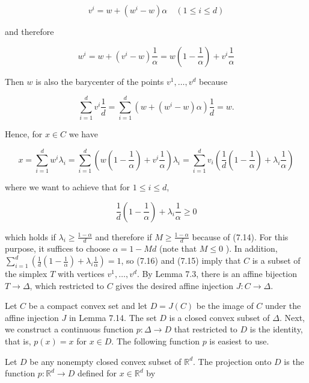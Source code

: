 \documentclass[12pt]{article}
\begin{document}
$$
v^{i}=w+\left(w^{i}-w\right) \alpha \quad(1 \leq i \leq d)
$$

and therefore

$$
w^{i}=w+\left(v^{i}-w\right) \frac{1}{\alpha}=w\left(1-\frac{1}{\alpha}\right)+v^{i} \frac{1}{\alpha}
$$

Then $w$ is also the barycenter of the points $v^{1}, \ldots, v^{d}$ because

$$
\sum_{i=1}^{d} v^{i} \frac{1}{d}=\sum_{i=1}^{d}\left(w+\left(w^{i}-w\right) \alpha\right) \frac{1}{d}=w .
$$

Hence, for $x \in C$ we have


\begin{equation*}
x=\sum_{i=1}^{d} w^{i} \lambda_{i}=\sum_{i=1}^{d}\left(w\left(1-\frac{1}{\alpha}\right)+v^{i} \frac{1}{\alpha}\right) \lambda_{i}=\sum_{i=1}^{d} v_{i}\left(\frac{1}{d}\left(1-\frac{1}{\alpha}\right)+\lambda_{i} \frac{1}{\alpha}\right) \tag{7.15}
\end{equation*}


where we want to achieve that for $1 \leq i \leq d$,


\begin{equation*}
\frac{1}{d}\left(1-\frac{1}{\alpha}\right)+\lambda_{i} \frac{1}{\alpha} \geq 0 \tag{7.16}
\end{equation*}


which holds if $\lambda_{i} \geq \frac{1-\alpha}{d}$ and therefore if $M \geq \frac{1-\alpha}{d}$ because of (7.14). For this purpose, it suffices to choose $\alpha=1-M d$ (note that $M \leq 0$ ). In addition, $\sum_{i=1}^{d}\left(\frac{1}{d}\left(1-\frac{1}{\alpha}\right)+\lambda_{i} \frac{1}{\alpha}\right)=1$, so (7.16) and (7.15) imply that $C$ is a subset of the simplex $T$ with vertices $v^{1}, \ldots, v^{d}$. By Lemma 7.3, there is an affine bijection $T \rightarrow \Delta$, which restricted to $C$ gives the desired affine injection $J: C \rightarrow \Delta$.

Let $C$ be a compact convex set and let $D=J(C)$ be the image of $C$ under the affine injection $J$ in Lemma 7.14. The set $D$ is a closed convex subset of $\Delta$. Next, we construct a continuous function $p: \Delta \rightarrow D$ that restricted to $D$ is the identity, that is, $p(x)=x$ for $x \in D$. The following function $p$ is easiest to use.

Let $D$ be any nonempty closed convex subset of $\mathbb{R}^{d}$. The projection onto $D$ is the function $p: \mathbb{R}^{d} \rightarrow D$ defined for $x \in \mathbb{R}^{d}$ by
\end{document}
